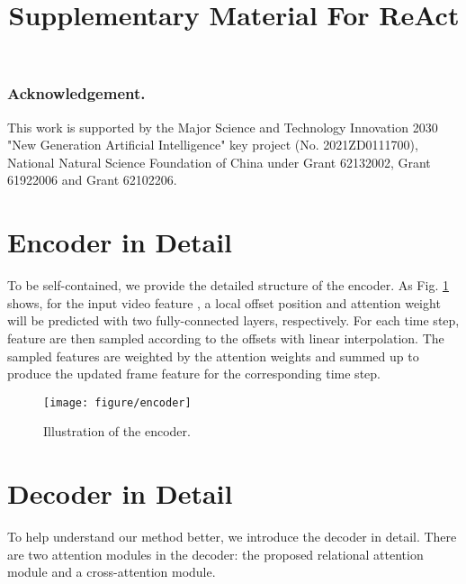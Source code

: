 \documentclass[runningheads]{llncs}
\newcommand{\figref}[1]{Fig. \ref{#1}}
\begin{document}
\subsubsection{Acknowledgement.} 
This work is supported by the Major Science and Technology Innovation 2030 "New Generation Artificial Intelligence" key project (No. 2021ZD0111700), National Natural Science Foundation of China under Grant 62132002, Grant 61922006 and Grant 62102206.

\clearpage






\appendix


\title{Supplementary Material For ReAct} 

\author{}
\institute{}
\maketitle



\section{Encoder in Detail}
To be self-contained, we provide the detailed structure of the encoder.
As \figref{encoder} shows, for the input video feature , a local offset position and attention weight will be predicted with two fully-connected layers, respectively. For each time step, feature are then sampled according to the  offsets with linear interpolation. The sampled features are weighted by the attention weights and summed up to produce the updated frame feature for the corresponding time step.

\vspace{-0.4 cm}
\begin{figure}[]
    \centering
    \setlength{\abovecaptionskip}{-0.2cm}
    \texttt{[image: figure/encoder]}
  \caption{Illustration of the encoder.}
  \label{encoder}
  \vspace{-0.5cm}
\end{figure}







\section{Decoder in Detail}
To help understand our method better, we introduce the decoder in detail. There are two attention modules in the decoder: the proposed relational attention module and a cross-attention module.
\end{document}
